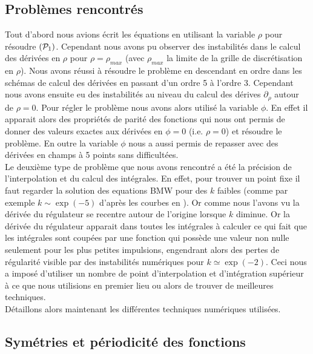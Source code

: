 \documentclass[10pt]{article}
\begin{document}
\begin{multicols}{2}
\subsection{Problèmes rencontrés}

\label{sec:Problemes}

Tout d'abord nous avions écrit les équations en utilisant la variable $\rho$ pour résoudre $(\mathcal{P}_1)$. Cependant nous avons pu observer des instabilités dans le calcul des dérivées en $\rho$ pour $\rho = \rho_{max}$ (avec $\rho_{max}$ la limite de la grille de discrétisation en $\rho$). Nous avons réussi à résoudre le problème en descendant en ordre dans les schémas de calcul des dérivées en passant d'un ordre 5 à l'ordre 3. Cependant nous avons ensuite eu des instabilités au niveau du calcul des dérives $\partial_{\rho}$ autour de $\rho = 0$. Pour régler le problème nous avons alors utilisé la variable $\phi$. En effet il apparait alors des propriétés de parité des fonctions qui nous ont permis de donner des valeurs exactes aux dérivées en $\phi = 0$ (i.e. $\rho = 0$) et résoudre le problème. En outre la variable $\phi$ nous a aussi permis de repasser avec des dérivées en champs à 5 points sans difficultées. \\

Le deuxième type de problème que nous avons rencontré a été la précision de l'interpolation et du calcul des intégrales. En effet, pour trouver un point fixe il faut regarder la solution des equations BMW pour des $k$ faibles (comme par exemple $k \sim \exp(-5)$ d'après les courbes en ). Or comme nous l'avons vu la dérivée du régulateur se recentre autour de l'origine lorsque $k$ diminue. Or la dérivée du régulateur apparait dans toutes les intégrales à calculer ce qui fait que les intégrales sont coupées par une fonction qui possède une valeur non nulle seulement pour les plus petites impulsions, engendrant alors des pertes de régularité visible par des instabilités numériques pour $k \simeq \exp(-2)$. Ceci nous a imposé d'utiliser un nombre de point d'interpolation et d'intégration supérieur à ce que nous utilisions en premier lieu ou alors de trouver de meilleures techniques. \\

Détaillons alors maintenant les différentes techniques numériques utilisées.

\vspace*{11pt}



\subsection{Symétries et périodicité des fonctions}



\end{multicols}
\end{document}
